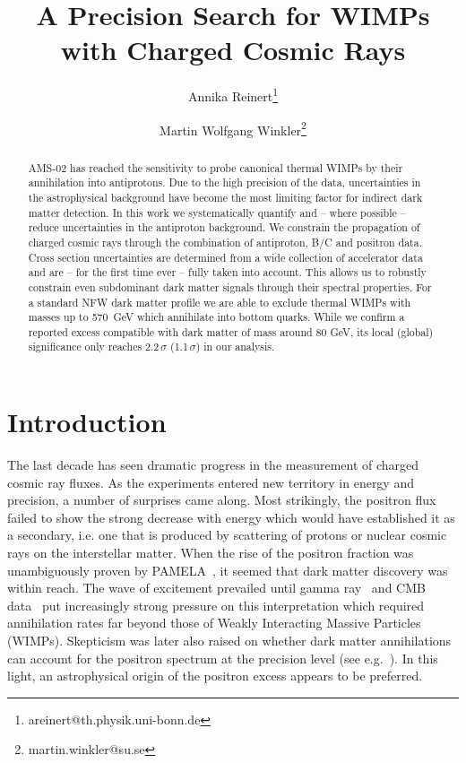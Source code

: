 \documentclass[a4paper,11pt]{article}
\date{}
\title{\Large\bf A Precision Search for WIMPs with Charged Cosmic Rays}
\author[1]{Annika Reinert\thanks{areinert@th.physik.uni-bonn.de}}
\author[2]{Martin Wolfgang Winkler\thanks{martin.winkler@su.se}}
\affil[1]{\AddrBonn}
\affil[2]{\AddrStockholm }
\begin{document}
\maketitle
\vspace*{0mm}
\begin{abstract}
AMS-02 has reached the sensitivity to probe canonical thermal WIMPs by their annihilation into antiprotons. Due to the high precision of the data, uncertainties in the astrophysical background have become the most limiting factor for indirect dark matter detection. In this work we systematically quantify and -- where possible -- reduce uncertainties in the antiproton background. We constrain the propagation of charged cosmic rays through the combination of antiproton, B/C and positron data. Cross section uncertainties are determined from a wide collection of accelerator data and are -- for the first time ever -- fully taken into account. This allows us to robustly constrain even subdominant dark matter signals through their spectral properties. For a standard NFW dark matter profile we are able to exclude thermal WIMPs with masses up to 570~GeV which annihilate into bottom quarks. While we confirm a reported excess compatible with dark matter of mass around 80 GeV, its local (global) significance only reaches 2.2$\,\sigma$ (1.1$\,\sigma$) in our analysis.
\end{abstract}
\clearpage

\section{Introduction}

The last decade has seen dramatic progress in the measurement of charged cosmic ray fluxes. As the experiments entered new territory in energy and precision, a number of surprises came along. Most strikingly, the positron flux failed to show the strong decrease with energy which would have established it as a secondary, i.e. one that is produced by scattering of protons or nuclear cosmic rays on the interstellar matter. When the rise of the positron fraction was unambiguously proven by PAMELA~\cite{Adriani:2008zr}, it seemed that dark matter discovery was within reach.
The wave of excitement prevailed until gamma ray~\cite{Abdo:2010dk,Ackermann:2011wa} and CMB data~\cite{Galli:2009zc,Slatyer:2009yq,Huetsi:2009ex} put increasingly strong pressure on this interpretation which required annihilation rates far beyond those of Weakly Interacting Massive Particles (WIMPs). Skepticism was later also raised on whether dark matter annihilations can account for the positron spectrum at the precision level (see e.g.~\cite{Boudaud:2016jvj}). 
In this light, an astrophysical origin of the positron excess appears to be preferred.
\end{document}
